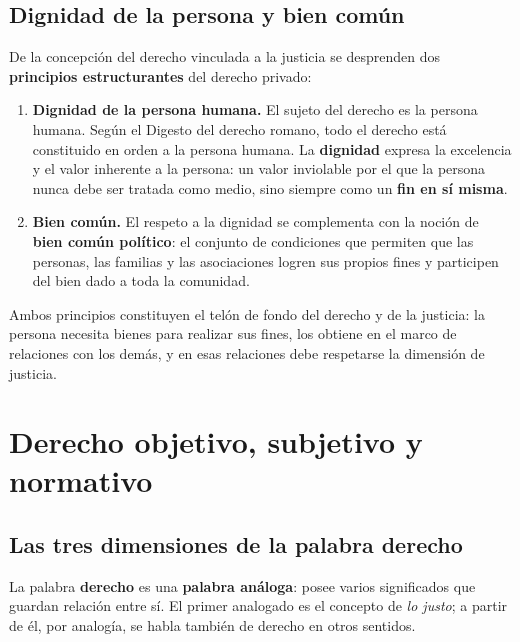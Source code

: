 \documentclass[12pt, a4paper]{report}
\begin{document}
\section{Dignidad de la persona y bien común}

De la concepción del derecho vinculada a la justicia se desprenden dos
\textbf{principios estructurantes} del derecho privado:

\begin{important}
\begin{enumerate}
  \item \textbf{Dignidad de la persona humana.} El sujeto del derecho es la
        persona humana. Según el Digesto del derecho romano, todo el derecho
        está constituido en orden a la persona humana. La \textbf{dignidad}
        expresa la excelencia y el valor inherente a la persona: un valor
        inviolable por el que la persona nunca debe ser tratada como medio,
        sino siempre como un \textbf{fin en sí misma}.

  \item \textbf{Bien común.} El respeto a la dignidad se complementa con la
        noción de \textbf{bien común político}: el conjunto de condiciones que
        permiten que las personas, las familias y las asociaciones logren sus
        propios fines y participen del bien dado a toda la comunidad.
\end{enumerate}
\end{important}

Ambos principios constituyen el telón de fondo del derecho y de la justicia: la
persona necesita bienes para realizar sus fines, los obtiene en el marco de
relaciones con los demás, y en esas relaciones debe respetarse la dimensión de
justicia.

\chapter{Derecho objetivo, subjetivo y normativo}

\section{Las tres dimensiones de la palabra derecho}

La palabra \textbf{derecho} es una \textbf{palabra análoga}: posee varios
significados que guardan relación entre sí. El primer analogado es el concepto
de \textit{lo justo}; a partir de él, por analogía, se habla también de derecho
en otros sentidos.
\end{document}
